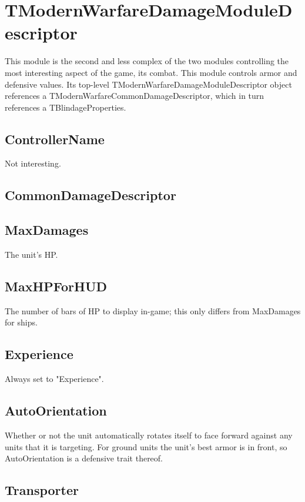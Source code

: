 \documentclass{article}
\begin{document}
\section{TModernWarfareDamageModuleDescriptor}

This module is the second and less complex of the two modules controlling the most interesting aspect of the game, its combat. This module controls armor and defensive values. Its top-level TModernWarfareDamageModuleDescriptor object references a TModernWarfareCommonDamageDescriptor, which in turn references a TBlindageProperties.

\subsection{ControllerName}

Not interesting.

\subsection{CommonDamageDescriptor}


\subsection{MaxDamages}

The unit's HP.

\subsection{MaxHPForHUD}

The number of bars of HP to display in-game; this only differs from MaxDamages for ships.

\subsection{Experience}

Always set to "Experience".

\subsection{AutoOrientation}

Whether or not the unit automatically rotates itself to face forward against any units that it is targeting. For ground units the unit's best armor is in front, so AutoOrientation is a defensive trait thereof.

\subsection{Transporter}
\end{document}
